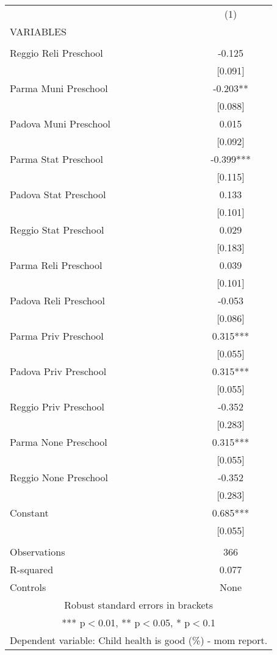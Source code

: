 \begin{tabular}{lc} \hline
 & (1) \\
VARIABLES &  \\ \hline
 &  \\
Reggio Reli Preschool & -0.125 \\
 & [0.091] \\
Parma Muni Preschool & -0.203** \\
 & [0.088] \\
Padova Muni Preschool & 0.015 \\
 & [0.092] \\
Parma Stat Preschool & -0.399*** \\
 & [0.115] \\
Padova Stat Preschool & 0.133 \\
 & [0.101] \\
Reggio Stat Preschool & 0.029 \\
 & [0.183] \\
Parma Reli Preschool & 0.039 \\
 & [0.101] \\
Padova Reli Preschool & -0.053 \\
 & [0.086] \\
Parma Priv Preschool & 0.315*** \\
 & [0.055] \\
Padova Priv Preschool & 0.315*** \\
 & [0.055] \\
Reggio Priv Preschool & -0.352 \\
 & [0.283] \\
Parma None Preschool & 0.315*** \\
 & [0.055] \\
Reggio None Preschool & -0.352 \\
 & [0.283] \\
Constant & 0.685*** \\
 & [0.055] \\
 &  \\
Observations & 366 \\
R-squared & 0.077 \\
 Controls & None \\ \hline
\multicolumn{2}{c}{ Robust standard errors in brackets} \\
\multicolumn{2}{c}{ *** p$<$0.01, ** p$<$0.05, * p$<$0.1} \\
\multicolumn{2}{c}{ Dependent variable: Child health is good (\%) - mom report.} \\
\end{tabular}
